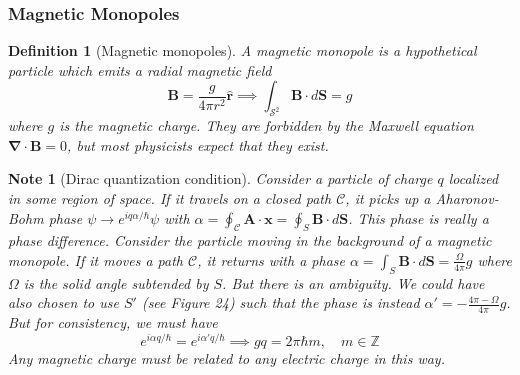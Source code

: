 \documentclass[a4paper]{article}
\newtheorem{Note}{Note}[section]
\theoremstyle{new}
\newtheorem{defi}{Definition}[section]
\begin{document}
\subsubsection{Magnetic Monopoles}
\begin{defi}[Magnetic monopoles]
A magnetic monopole is a hypothetical particle which emits a radial magnetic field
$$\mathbf{B}=\frac{g}{4\pi r^2}\mathbf{\hat{r}}\implies\int_{\mathcal{S}^2}\mathbf{B}\cdot d\mathbf{S}=g$$
where $g$ is the magnetic charge. They are forbidden by the Maxwell equation $\boldsymbol{\nabla}\cdot\mathbf{B}=0$, but most physicists expect that they exist. 
\end{defi}


\begin{Note}[Dirac quantization condition]
Consider a particle of charge $q$ localized in some region of space. If it travels on a closed path $\mathcal{C}$, it picks up a Aharonov-Bohm phase $\psi\rightarrow e^{iq\alpha/\hbar}\psi$ with $\alpha=\oint_{\mathcal{C}}\mathbf{A}\cdot \mathbf{x}=\oint_S\mathbf{B}\cdot d\mathbf{S}$. This phase is really a phase difference. Consider the particle moving in the background of a magnetic monopole. If it moves a path $\mathcal{C}$, it returns with a phase $\alpha=\int_S\mathbf{B}\cdot d\mathbf{S}=\frac{\Omega}{4\pi}g$ where $\Omega$ is the solid angle subtended by $S$. But there is an ambiguity. We could have also chosen to use $S'$ (see Figure 24) such that the phase is instead $\alpha'=-\frac{4\pi-\Omega}{4\pi}g$. But for consistency, we must have
$$e^{i\alpha q/\hbar}=e^{i\alpha'q/\hbar}\implies gq=2\pi\hbar m,\quad m\in\mathbb{Z}$$
Any magnetic charge must be related to any electric charge in this way.
\end{Note}
\newpage
\end{document}
